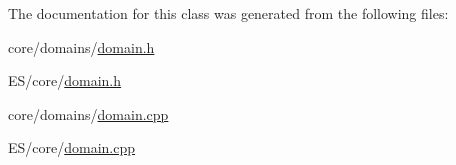 The documentation for this class was generated from the following files:\begin{DoxyCompactItemize}
\item 
core/domains/\hyperlink{core_2domains_2domain_8h}{domain.h}\item 
ES/core/\hyperlink{_e_s_2core_2domain_8h}{domain.h}\item 
core/domains/\hyperlink{core_2domains_2domain_8cpp}{domain.cpp}\item 
ES/core/\hyperlink{_e_s_2core_2domain_8cpp}{domain.cpp}\end{DoxyCompactItemize}
